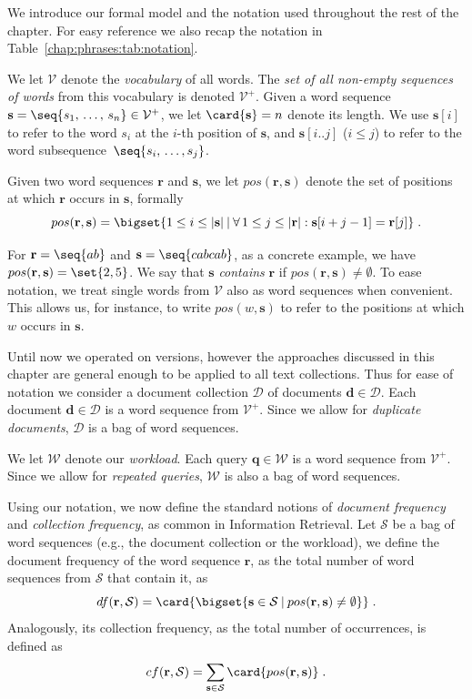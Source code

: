 We introduce our formal model and the notation used throughout the rest of the chapter. For easy reference we also recap the notation in Table~\ref{chap:phrases:tab:notation}.

We let $\mathcal{V}$ denote the \emph{vocabulary} of all words. The
\emph{set of all non-empty sequences of words} from this vocabulary is
denoted $\mathcal{V}^{+}$. Given a word sequence
$\mathbf{s} = \seq{s_1,\,\ldots,\,s_n} \in \mathcal{V}^{+}$, we let
$\card{\mathbf{s}} = n$ denote its length. We use $\mathbf{s}[i]$ to
refer to the word $s_i$ at the $i$-th position of $\mathbf{s}$, and
$\mathbf{s}[i..j]$ ($i\le j$) to refer to the word
subsequence~$\seq{s_i,\,\ldots,s_j}$.

\begin{definition}
Given two word sequences $\mathbf{r}$ and $\mathbf{s}$, we let
$pos(\mathbf{r},\mathbf{s})$ denote the set of positions at which
$\mathbf{r}$ occurs in $\mathbf{s}$, formally
$$ %
pos(\mathbf{r},\mathbf{s}) = \bigset{1 \le i \le |\mathbf{s}| \:|\: \forall\, 1 \le j \le |\mathbf{r}| : \mathbf{s}[i + j - 1] = \mathbf{r}[j]}\;. %
$$ %
\end{definition}

For $\mathbf{r} = \seq{a b}$ and $\mathbf{s} = \seq{c a b c a b}$, as
a concrete example, we have $pos(\mathbf{r},\mathbf{s}) = \set{2,5}$.
We say that $\mathbf{s}$ \emph{contains} $\mathbf{r}$ if
$pos(\mathbf{r},\mathbf{s}) \neq \emptyset$. To ease notation, we
treat single words from $\mathcal{V}$ also as word sequences when
convenient. This allows us, for instance, to write
$pos(w, \mathbf{s})$ to refer to the positions at which $w$ occurs in
$\mathbf{s}$.

Until now we operated on versions, however the approaches discussed in this chapter are general enough to be applied to all text collections. Thus for ease of notation we consider a document collection $\mathcal{D}$ of documents $\mathbf{d} \in \mathcal{D}$.
Each
document $\mathbf{d} \in \mathcal{D}$ is a word sequence from
$\mathcal{V}^{+}$. Since we allow for \emph{duplicate documents},
$\mathcal{D}$ is a bag of word sequences.

We let $\mathcal{W}$ denote our \emph{workload}. Each query
$\mathbf{q} \in \mathcal{W}$ is a word sequence from
$\mathcal{V}^{+}$. Since we allow for \emph{repeated queries},
$\mathcal{W}$ is also a bag of word sequences.

Using our notation, we now define the standard notions of
\emph{document frequency} and \emph{collection frequency}, as common
in Information Retrieval. Let $\mathcal{S}$ be a bag of word sequences
(e.g., the document collection or the workload), we define the
document frequency of the word sequence $\mathbf{r}$, as the total
number of word sequences from $\mathcal{S}$ that contain it, as
$$ %
df(\mathbf{r}, \mathcal{S}) = \card{\bigset{\mathbf{s} \in \mathcal{S} \:|\: pos(\mathbf{r},\mathbf{s}) \neq \emptyset }} \;. %
$$ %
Analogously, its collection frequency, as the total number of
occurrences, is defined as
$$ %
cf(\mathbf{r}, \mathcal{S}) = \sum_{\mathbf{s} \in \mathcal{S}} \card{pos(\mathbf{r},\mathbf{s})} \;. %
$$ %


